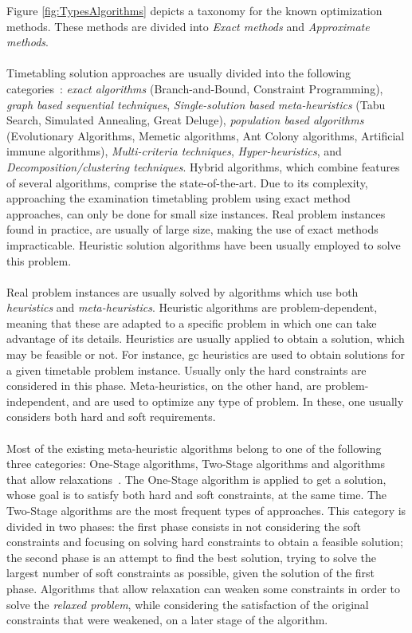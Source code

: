 Figure \ref{fig:TypesAlgorithms} depicts a taxonomy for the known optimization methods. These methods are divided into \textit{Exact methods} and \textit{Approximate methods}.\\
\\
Timetabling solution approaches are usually divided into the following categories~\cite{Qu2009}: \textit{exact algorithms} (Branch-and-Bound, Constraint Programming), \textit{graph based sequential techniques}, \textit{Single-solution based meta-heuristics} (Tabu Search, Simulated Annealing, Great Deluge), \textit{population based algorithms} (Evolutionary Algorithms, Memetic algorithms, Ant Colony algorithms, Artificial immune algorithms), \textit{Multi-criteria techniques}, \textit{Hyper-heuristics}, and \textit{Decomposition/clustering techniques}. Hybrid algorithms, which combine features of several algorithms, comprise the state-of-the-art. Due to its complexity, approaching the examination timetabling problem using exact method approaches, can only be done for small size instances. Real problem instances found in practice, are usually of large size, making the use of exact methods impracticable. Heuristic solution algorithms have been usually employed to solve this problem.\\
\\
Real problem instances are usually solved by algorithms which use both \textit{heuristics} and \textit{meta-heuristics}. Heuristic algorithms are problem-dependent, meaning that these are adapted to a specific problem in which one can take advantage of its details. Heuristics are usually applied to obtain a solution, which may be feasible or not. For instance, \gls{gc} heuristics are used to obtain solutions for a given timetable problem instance. Usually only the hard constraints are considered in this phase. Meta-heuristics, on the other hand, are problem-independent, and are used to optimize any type of problem. In these, one usually considers both hard and soft requirements.\\
\\
Most of the existing meta-heuristic algorithms belong to one of the following three categories: One-Stage algorithms, Two-Stage algorithms and algorithms that allow relaxations~\cite{Lewis2007}. The One-Stage algorithm is applied to get a solution, whose goal is to satisfy both hard and soft constraints, at the same time. The Two-Stage algorithms are the most frequent types of approaches. This category is divided in two phases: the first phase consists in not considering the soft constraints and focusing on solving hard constraints to obtain a feasible solution; the second phase is an attempt to find the best solution, trying to solve the largest number of soft constraints as possible, given the solution of the first phase. Algorithms that allow relaxation can weaken some constraints in order to solve the \textit{relaxed problem}, while considering the satisfaction of the original constraints that were weakened, on a later stage of the algorithm.


